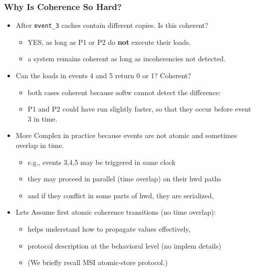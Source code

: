 \documentclass{beamer}
\begin{document}
\begin{frame}[fragile,t]
\frametitle{Why Is Coherence So Hard?}

\begin{itemize}
    \item After {\tt event\_3} caches contain different copies. Is this coherent?\smallskip
        \begin{itemize}
            \item YES, as long as P1 or P2 do {\bf not} execute their loads.
            \item a system remains coherent as long as incoherencies not detected.
        \end  {itemize}\bigskip

    \item Can the loads in events 4 and 5 return 0 or 1? Coherent?\smallskip
        \begin{itemize}
            \item both cases coherent because softw cannot detect the difference:
            \item P1 and P2 could have run slightly faster, so that they occur before event 3 in time.
        \end  {itemize}\medskip

    \item More Complex in practice because events are not atomic and sometimes overlap in time.\smallskip
        \begin{itemize}
            \item e.g., events 3,4,5 may be triggered in same clock
            \item they may proceed in parallel (time overlap)
                    on their hwd paths
            \item and if they conflict in some parts of hwd, they are serialized,
        \end  {itemize}\medskip

    \item Lets Assume first atomic coherence transitions (no time overlap):\smallskip
        \begin{itemize}
            \item helps understand how to propagate values effectively,
            \item protocol description at the behavioral level (no implem details)
            \item (We briefly recall MSI atomic-store protocol.)
        \end  {itemize}\medskip
\end{itemize}

\end{frame}
\end{document}
